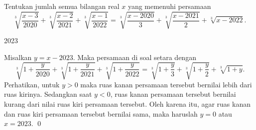 \documentclass[12pt]{scrartcl}
\begin{document}
	\begin{soaljawab}
		Tentukan jumlah semua bilangan real $x$ yang memenuhi persamaan $$\sqrt[3]{\frac{x-3}{2020}}+\sqrt[3]{\frac{x-2}{2021}}+\sqrt[3]{\frac{x-1}{2022}}=\sqrt[3]{\frac{x-2020}{3}}+\sqrt[3]{\frac{x-2021}{2}}+\sqrt[3]{x-2022}.$$
		
		\begin{jawaban}
		2023
		\end{jawaban}
		\begin{solusi}
		Misalkan $y=x-2023$. Maka persamaan di soal setara dengan 
		$$\sqrt[3]{1+\frac{y}{2020}}+\sqrt[3]{1+\frac{y}{2021}}+\sqrt[3]{1+\frac{y}{2022}}=\sqrt[3]{1+\frac{y}{3}}+\sqrt[3]{1+\frac{y}{2}}+\sqrt[3]{1+y}.$$
		Perhatikan, untuk $y>0$ maka ruas kanan persamaan tersebut bernilai lebih dari ruas kirinya. Sedangkan saat $y<0$, ruas kanan persamaan tersebut bernilai kurang dari nilai ruas kiri persamaan tersebut. Oleh karena itu, agar ruas kanan dan ruas kiri persamaan tersebut bernilai sama, maka haruslah $y=0$ atau $x=2023$. \qed
		\end{solusi}
	\end{soaljawab}
	
\end{document}
